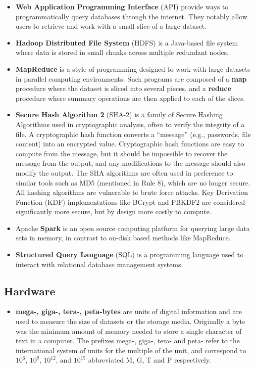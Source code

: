 \documentclass[10pt,letterpaper]{article}
\providecommand{\tightlist}{%
  \setlength{\itemsep}{0pt}\setlength{\parskip}{0pt}
}
\begin{document}
\begin{itemize}
\item
  \textbf{Web Application Programming Interface} (API) provide ways to
  programmatically query databases through the internet. They notably
  allow users to retrieve and work with a small slice of a large
  dataset.
\item
  \textbf{Hadoop Distributed File System} (HDFS) is a Java-based file
  system where data is stored in small chunks across multiple redundant
  nodes.
\item
  \textbf{MapReduce} is a style of programming designed to work with
  large datasets in parallel computing environments. Such programs are
  composed of a \textbf{map} procedure where the dataset is sliced into
  several pieces, and a \textbf{reduce} procedure where summary
  operations are then applied to each of the slices.
\item
  \textbf{Secure Hash Algorithm 2} (SHA-2) is a family of Secure Hashing
  Algorithms used in cryptographic analysis, often to verify the
  integrity of a file. A cryptographic hash function converts a
  ``message'' (e.g., passwords, file content) into an encrypted value.
  Cryptographic hash functions are easy to compute from the message, but
  it should be impossible to recover the message from the output, and
  any modifications to the message should also modify the output. The
  SHA algorithms are often used in preference to similar tools such as
  MD5 (mentioned in Rule 8), which are no longer secure. All hashing
  algorithms are vulnerable to brute force attacks. Key Derivation
  Function (KDF) implementations like BCrypt and PBKDF2 are considered
  significantly more secure, but by design more costly to compute.
\item
  Apache \textbf{Spark} is an open source computing platform for
  querying large data sets in memory, in contrast to on-disk based
  methods like MapReduce.
\item
  \textbf{Structured Query Language} (SQL) is a programming language
  used to interact with relational database management systems.
\end{itemize}

\subsection*{Hardware}\label{hardware}

\begin{itemize}
\tightlist
\item
  \textbf{mega-, giga-, tera-, peta-bytes} are units of digital
  information and are used to measure the size of datasets or the
  storage media. Originally a byte was the minimum amount of memory
  needed to store a single character of text in a computer. The prefixes
  mega-, giga-, tera- and peta- refer to the international system of
  units for the multiple of the unit, and correspond to \(10^{6}\),
  \(10^{9}\), \(10^{12}\), and \(10^{15}\) abbreviated M, G, T and P
  respectively.
\end{itemize}
\end{document}
